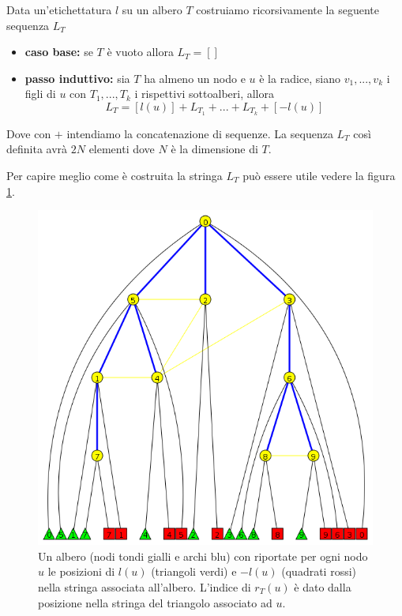 \documentclass[a4paper,10pt]{amsbook}
\theoremstyle{plain}
\theoremstyle{definition}
\theoremstyle{remark}
\newcommand{\bra}[1]{\left[#1\right]}
\begin{document}
Data un'etichettatura $l$ su un albero $T$ costruiamo ricorsivamente
la seguente sequenza $L_T$
\begin{itemize}
\item \textbf{caso base:} se $T$ \`e vuoto allora $L_T = \bra{}$
\item \textbf{passo induttivo:} sia $T$ ha almeno un nodo e $u$ \`e la
  radice, siano $v_1,... ,v_k$ i figli di $u$ con $T_1,...,T_k$ i
  rispettivi sottoalberi, allora
  \[ L_T = \bra{ l(u) } + L_{T_1} + ... + L_{T_k} + \bra{ -l(u) } \]
\end{itemize}
Dove con $+$ intendiamo la concatenazione di sequenze. La sequenza
$L_T$ cos\`i definita avr\`a $2N$ elementi dove $N$ \`e la dimensione
di $T$.

Per capire meglio come \`e costruita la stringa $L_T$ pu\`o essere
utile vedere la figura~ \ref{fig:labeltree}.

\begin{figure}[h]
  \centering
  \includegraphics[width=1\textwidth]{labeltree}
  \caption{Un albero (nodi tondi gialli e archi blu) con riportate per
    ogni nodo $u$ le posizioni di $l(u)$ (triangoli verdi) e $-l(u)$
    (quadrati rossi) nella stringa associata all'albero. L'indice di
  $r_T(u)$ \`e dato dalla posizione nella stringa del triangolo
  associato ad $u$.}
  \label{fig:labeltree}
\end{figure}
\end{document}
